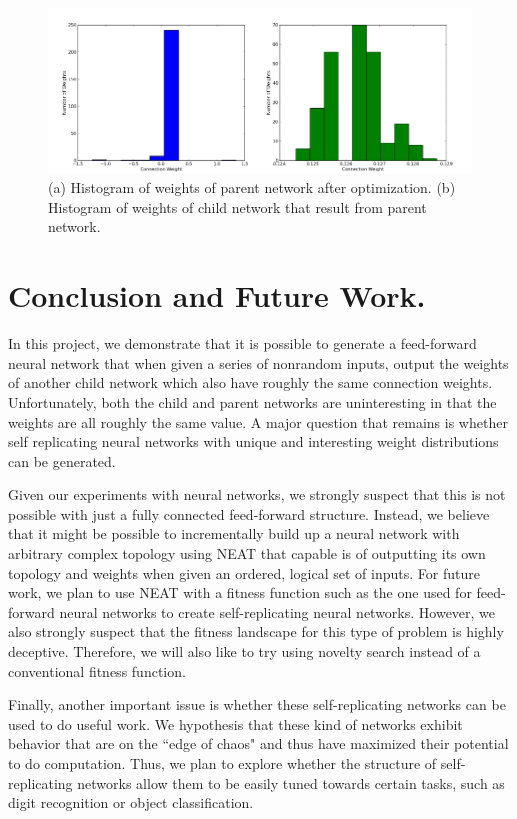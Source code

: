 \documentclass[12pt]{article}
\begin{document}
\begin{figure}[h]
\begin{center}
  \includegraphics[width=1.0\linewidth]{histogram.png}
\end{center}
   \caption{(a) Histogram of weights of parent network after optimization. (b) Histogram of weights of child network that result from parent network.}
\label{histogram}
\end{figure}

\section{Conclusion and Future Work.}
\label{conclusion}

In this project, we demonstrate that it is possible to generate
a feed-forward neural network that when given a series of nonrandom inputs,
output the weights of another child network which also
have roughly the same connection weights. Unfortunately, both the
child and parent networks are uninteresting in that the weights are all roughly
the same value. A major question that remains is whether self replicating neural 
networks with unique and interesting weight distributions can be generated.

Given our experiments with neural networks, we strongly suspect that this is
not possible with just a fully connected feed-forward structure. Instead, we believe
that it might be possible to incrementally build up a neural network with arbitrary
complex topology using NEAT \cite{stanley2004efficient} that capable is of outputting
its own topology and weights when given an ordered, logical set of inputs. 
For future work, we plan to use NEAT with a fitness 
function such as the one used for feed-forward neural networks to create self-replicating
neural networks. However, we also strongly
suspect that the fitness landscape for this type of problem is highly deceptive.
Therefore, we will also like to try using novelty search \cite{lehman2008exploiting}
instead of a conventional fitness function.

Finally, another important issue is whether these self-replicating networks
can be used to do useful work. We hypothesis that these kind of networks exhibit
behavior that are on the ``edge of chaos" and thus have maximized their potential
to do computation. Thus, we plan to explore whether the structure of
self-replicating networks allow them to be easily tuned towards certain tasks, such as digit
recognition or object classification.

\renewcommand{\refname}{\section{References}}


\end{document}
